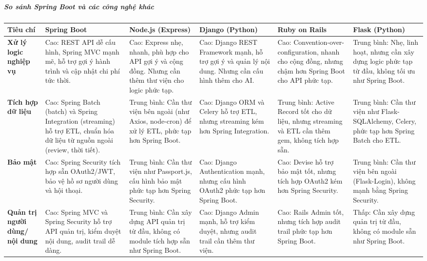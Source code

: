 \subparagraph{So sánh Spring Boot và các công nghệ khác}
\clearpage
\begin{landscape}
\begin{table}[h!]
\centering
\setlength{\tabcolsep}{4pt}
\footnotesize
\begin{tabularx}{\linewidth}{|l|X|X|X|X|X|}
\hline
\textbf{Tiêu chí} & \textbf{Spring Boot} & \textbf{Node.js (Express)} & \textbf{Django (Python)} & \textbf{Ruby on Rails} & \textbf{Flask (Python)} \\
\hline
\textbf{Xử lý logic nghiệp vụ} & Cao: REST API dễ cấu hình, Spring MVC mạnh mẽ, hỗ trợ gợi ý hành trình và cập nhật chi phí tức thời. & Cao: Express nhẹ, nhanh, phù hợp cho API gợi ý và cộng đồng. Nhưng cần thêm thư viện cho logic phức tạp. & Cao: Django REST Framework mạnh, hỗ trợ gợi ý và quản lý nội dung. Nhưng cần cấu hình thêm cho AI. & Cao: Convention-over-configuration, nhanh cho cộng đồng, nhưng chậm hơn Spring Boot cho API phức tạp. & Trung bình: Nhẹ, linh hoạt, nhưng cần xây dựng logic phức tạp từ đầu, không tối ưu như Spring Boot. \\
\hline
\textbf{Tích hợp dữ liệu} & Cao: Spring Batch (batch) và Spring Integration (streaming) hỗ trợ ETL, chuẩn hóa dữ liệu từ nguồn ngoài (review, thời tiết). & Trung bình: Cần thư viện bên ngoài (như Axios, node-cron) để xử lý ETL, phức tạp hơn Spring Boot. & Cao: Django ORM và Celery hỗ trợ ETL, nhưng streaming kém hơn Spring Integration. & Trung bình: Active Record tốt cho dữ liệu, nhưng streaming và ETL cần thêm gem, không tích hợp sẵn. & Trung bình: Cần thư viện như Flask-SQLAlchemy, Celery, phức tạp hơn Spring Batch cho ETL. \\
\hline
\textbf{Bảo mật} & Cao: Spring Security tích hợp sẵn OAuth2/JWT, bảo vệ hồ sơ người dùng và hội thoại. & Trung bình: Cần thư viện như Passport.js, cấu hình bảo mật phức tạp hơn Spring Security. & Cao: Django Authentication mạnh, nhưng cấu hình OAuth2 phức tạp hơn Spring Boot. & Cao: Devise hỗ trợ bảo mật tốt, nhưng tích hợp OAuth2 kém hơn Spring Security. & Trung bình: Cần thư viện bên ngoài (Flask-Login), không mạnh bằng Spring Security. \\
\hline
\textbf{Quản trị người dùng/ nội dung} & Cao: Spring MVC và Spring Security hỗ trợ API quản trị, kiểm duyệt nội dung, audit trail dễ dàng. & Trung bình: Cần xây dựng API quản trị từ đầu, không có module tích hợp sẵn như Spring Boot. & Cao: Django Admin mạnh, hỗ trợ kiểm duyệt, nhưng audit trail cần thêm thư viện. & Cao: Rails Admin tốt, nhưng tích hợp audit trail phức tạp hơn Spring Boot. & Thấp: Cần xây dựng quản trị từ đầu, không có module sẵn như Spring Boot. \\

\end{tabularx}
\end{table}
\end{landscape}

